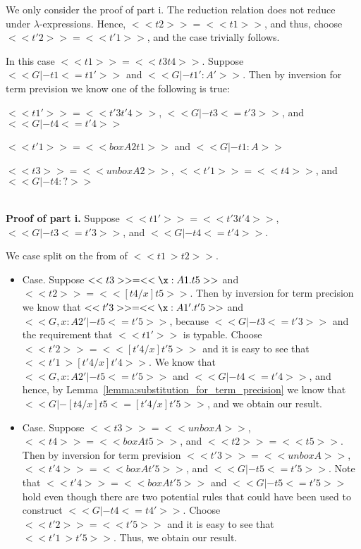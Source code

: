 \begin{description}
  \noindent
  We only consider the proof of part i. The reduction relation does not reduce under
  $\lambda$-expressions.  Hence, $<<t2>> = <<t1>>$, and thus, choose $<<t'2>> = <<t'1>>$, and
  the case trivially follows.  
  
\item[]
\item 

  \noindent
  In this case $<<t1>> = <<t3 t4>>$.  Suppose $<<G |- t1 <= t1'>>$ and $<<G |- t1' : A'>>$.
  Then by inversion for term prevision we know one of the following is true:
  \begin{enumR}
  \item $<<t1'>> = <<t'3 t'4>>$, $<<G |- t3 <= t'3>>$, and $<<G |- t4 <= t'4>>$
  \item $<<t'1>> = <<box A2 t1>>$ and $<<G |- t1 : A>>$
  \item $<<t3>> = <<unbox A2>>$, $<<t'1>> = <<t4>>$, and $<<G |- t4 : ?>>$
  \end{enumR}

  \ \\
  \noindent
  \textbf{Proof of part i.}  Suppose $<<t1'>> = <<t'3 t'4>>$, $<<G |- t3 <= t'3>>$, and $<<G |- t4 <= t'4>>$.

  We case split on the from of $<<t1 ~> t2>>$.
  \begin{itemize}
  \item[] Case.  Suppose $<<t3>> = <<\x:A1.t5>>$ and $<<t2>> = << [t4/x]t5>>$.
    Then by inversion for term precision we know that
    $<<t'3>> = <<\x:A1'.t'5>>$ and $<<G, x : A2' |- t5 <= t'5>>$,
    because $<<G |- t3 <= t'3>>$ and the requirement that $<<t1'>>$ is typable. Choose $<<t'2>> = << [t'4/x]t'5>>$
    and it is easy to see that $<<t'1 ~> [t'4/x]t'4>>$.
    We know that $<<G, x : A2' |- t5 <= t'5>>$ and $<<G |- t4 <= t'4>>$, and hence,
    by Lemma~\ref{lemma:substitution_for_term_precision} we know that
    $<<G |- [t4/x]t5 <= [t'4/x]t'5>>$, and we obtain our result.
    
  \item[] Case.  Suppose $<<t3>> = <<unbox A>>$, $<<t4>> = <<box A t5>>$, and $<<t2>> = <<t5>>$.
    Then by inversion for term prevision $<<t'3>> = <<unbox A>>$, $<<t'4>> = <<box A t'5>>$, and $<<G |- t5 <= t'5>>$.
    Note that $<<t'4>> = <<box A t'5>>$ and $<<G |- t5 <= t'5>>$ hold even though there are two potential rules
    that could have been used to construct $<<G |- t4 <= t4'>>$. 
    Choose $<<t'2>> = <<t'5>>$ and it is easy to see that $<<t'1 ~> t'5>>$.  Thus, we obtain our result.    


\end{itemize}
\end{description}
